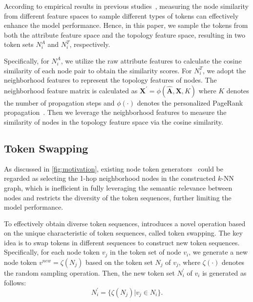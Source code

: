 According to empirical results in previous studies~\cite{ansgt,vcrgt}, measuring the node similarity from different feature spaces to sample different types of tokens can effectively enhance the model performance.
Hence, in this paper, we sample the tokens from both the attribute feature space and the topology feature space, resulting in two token sets $N^{A}_i$ and $N^{T}_i$, respectively.

Specifically, for $N^{A}_i$, we utilize the raw attribute features to calculate the cosine similarity of each node pair to obtain the similarity scores.
For $N^{T}_i$, we adopt the neighborhood features to represent the topology features of nodes.
The neighborhood feature matrix is calculated as $\mathbf{X}^{\prime}= \phi(\hat{\mathbf{A}}, \mathbf{X}, K)$ where $K$ denotes the number of propagation steps and $\phi(\cdot)$ denotes the personalized PageRank propagation~\cite{appnp}.
Then we leverage the neighborhood features to measure the similarity of nodes in the topology feature space via the cosine similarity.




\subsection{Token Swapping}\label{sec:swapping}
As discussed in \autoref{fig:motivation}, existing node token generators~\cite{gophormer,ansgt,vcrgt} could be regarded as selecting the 1-hop neighborhood nodes in the constructed $k$-NN graph, which is inefficient in fully leveraging the semantic relevance between nodes and restricts the diversity of the token sequences, further limiting the model performance. 

To effectively obtain diverse token sequences, \name introduces a novel operation based on the unique characteristic of token sequences, called token swapping.
The key idea is to swap tokens in different sequences to construct new token sequences.
Specifically, for each node token $v_j$ in the token set of node $v_i$, we generate a new node token $v^{new}= \zeta(N_j)$ based on the token set $N_j$ of $v_j$, where $\zeta(\cdot)$ denotes the random sampling operation.
Then, the new token set $N^{\prime}_i$ of $v_i$ is generated as follows:
\begin{equation}
    N^{\prime}_i=\{\zeta(N_j)|v_j\in N_i\}.
    \label{eq:condidate_token}
\end{equation}

